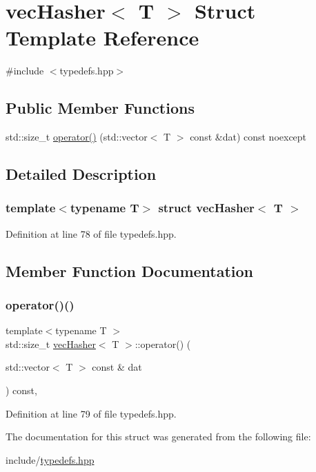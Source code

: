 \hypertarget{structvec_hasher}{}\section{vec\+Hasher$<$ T $>$ Struct Template Reference}
\label{structvec_hasher}


{\ttfamily \#include $<$typedefs.\+hpp$>$}

\subsection*{Public Member Functions}
\begin{DoxyCompactItemize}
\item 
std\+::size\+\_\+t \hyperlink{structvec_hasher_ae8127d9b7d302fe59bd64e7067e7ba61}{operator()} (std\+::vector$<$ T $>$ const \&dat) const noexcept
\end{DoxyCompactItemize}


\subsection{Detailed Description}
\subsubsection*{template$<$typename T$>$\newline
struct vec\+Hasher$<$ T $>$}



Definition at line 78 of file typedefs.\+hpp.



\subsection{Member Function Documentation}
\mbox{\label{structvec_hasher_ae8127d9b7d302fe59bd64e7067e7ba61}} 
\subsubsection{\texorpdfstring{operator()()}{operator()()}}
{\footnotesize\ttfamily template$<$typename T $>$ \\
std\+::size\+\_\+t \hyperlink{structvec_hasher}{vec\+Hasher}$<$ T $>$\+::operator() (\begin{DoxyParamCaption}\item[{std\+::vector$<$ T $>$ const \&}]{dat }\end{DoxyParamCaption}) const\hspace{0.3cm}{\ttfamily [inline]}, {\ttfamily [noexcept]}}



Definition at line 79 of file typedefs.\+hpp.



The documentation for this struct was generated from the following file\+:\begin{DoxyCompactItemize}
\item 
include/\hyperlink{typedefs_8hpp}{typedefs.\+hpp}\end{DoxyCompactItemize}
